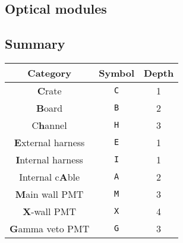 \subsection{Optical modules}



\subsection{Summary}

\begin{center}
\begin{tabular}{|c|c|c|}
  \hline
  Category & Symbol & Depth \\
  \hline
  \hline
  \textbf{C}rate & \texttt{C} & 1 \\
  \hline
  \textbf{B}oard & \texttt{B} & 2 \\
  \hline
  C\textbf{h}annel & \texttt{H} & 3 \\
  \hline
  \textbf{E}xternal harness & \texttt{E} & 1 \\
  \hline
  \textbf{I}nternal harness & \texttt{I} & 1 \\
  \hline
  Internal c\textbf{A}ble & \texttt{A} & 2 \\
  \hline
  \textbf{M}ain wall PMT & \texttt{M} & 3 \\
  \hline
  \textbf{X}-wall PMT & \texttt{X} & 4 \\
  \hline
  \textbf{G}amma veto PMT & \texttt{G} & 3 \\
  \hline
\end{tabular}
\end{center}

